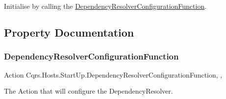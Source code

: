 Initialise by calling the \hyperlink{classCqrs_1_1Hosts_1_1StartUp_a73590d6dcba5b2d98cdb784d9e754db2_a73590d6dcba5b2d98cdb784d9e754db2}{Dependency\+Resolver\+Configuration\+Function}. 



\subsection{Property Documentation}
\mbox{\label{classCqrs_1_1Hosts_1_1StartUp_a73590d6dcba5b2d98cdb784d9e754db2_a73590d6dcba5b2d98cdb784d9e754db2}} 
\subsubsection{\texorpdfstring{Dependency\+Resolver\+Configuration\+Function}{DependencyResolverConfigurationFunction}}
{\footnotesize\ttfamily Action Cqrs.\+Hosts.\+Start\+Up.\+Dependency\+Resolver\+Configuration\+Function\hspace{0.3cm}{\ttfamily [get]}, {\ttfamily [set]}, {\ttfamily [protected]}}



The Action that will configure the Dependency\+Resolver. 

